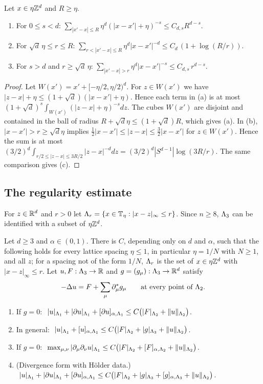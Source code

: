 \begin{lemma}\label{lem:lattice-sums}
Let $x\in\eta\mathbb Z^d$ and $R\ge\eta$.
\begin{enumerate}[label=(\alph*)]
\item For $0\le s<d$: $\sum_{|x'-x|\le R}\eta^d(|x-x'|+\eta)^{-s}\le C_{d,s}R^{d-s}$.
\item For $\sqrt d\,\eta\le r\le R$: $\sum_{r<|x'-x|\le R}\eta^d|x-x'|^{-d}\le C_d\,(1+\log(R/r))$.
\item For $s>d$ and $r\ge\sqrt d\,\eta$: $\sum_{|x'-x|>r}\eta^d|x-x'|^{-s}\le C_{d,s}\,r^{d-s}$.
\end{enumerate}
\end{lemma}

\begin{proof}
Let $W(x')=x'+[-\eta/2,\eta/2)^d$. For $z\in W(x')$ we have $|z-x|+\eta\le(1+\sqrt d)(|x-x'|+\eta)$. Hence each term in (a) is at most $(1+\sqrt d)^s\int_{W(x')}(|z-x|+\eta)^{-s}dz$. The cubes $W(x')$ are disjoint and contained in the ball of radius $R+\sqrt d\eta\le(1+\sqrt d)R$, which gives (a). In (b), $|x-x'|>r\ge\sqrt d\eta$ implies $\frac12|x-x'|\le|z-x|\le\frac32|x-x'|$ for $z\in W(x')$. Hence the sum is at most $(3/2)^d\int_{r/2\le|z-x|\le3R/2}|z-x|^{-d}dz=(3/2)^d|S^{d-1}|\log(3R/r)$. The same comparison gives (c).
\end{proof}

\subsection{The regularity estimate}

For $z\in\mathbb R^d$ and $r>0$ let $\Lambda_r=\{x\in\mathbb T_\eta:|x-z|_\infty\le r\}$. Since $n\ge8$, $\Lambda_3$ can be identified with a subset of $\eta\mathbb Z^d$.

\begin{theorem}\label{thm:local-regularity}
Let $d\ge3$ and $\alpha\in(0,1)$. There is $C$, depending only on $d$ and $\alpha$, such that the following holds for every lattice spacing $\eta\le1$, in particular $\eta=1/N$ with $N\ge1$, and all $z$; for a spacing not of the form $1/N$, $\Lambda_r$ is the set of $x\in\eta\mathbb Z^d$ with $|x-z|_\infty\le r$. Let $u,F:\Lambda_3\to\mathbb R$ and $g=(g_\mu):\Lambda_3\to\mathbb R^d$ satisfy
\[
-\Delta u=F+\sum_\mu\partial^*_\mu g_\mu\qquad\text{at every point of }\Lambda_2 .
\]
\begin{enumerate}[label=(\alph*)]
\item If $g=0$: $\ |u|_{\Lambda_1}+|\partial u|_{\Lambda_1}+[\partial u]_{\alpha,\Lambda_1}\le C\big(|F|_{\Lambda_2}+\|u\|_{\Lambda_2}\big)$.
\item In general: $\ |u|_{\Lam_1}+\Hol{u}{\Lam_1}\le C\big(|F|_{\Lam_2}+|g|_{\Lam_3}+\|u\|_{\Lam_2}\big)$.
\item If $g=0$: $\ \max_{\mu,\nu}|\partial_\mu\partial_\nu u|_{\Lambda_1}\le C\big(|F|_{\Lambda_2}+[F]_{\alpha,\Lambda_2}+\|u\|_{\Lambda_2}\big)$.
\item (Divergence form with H\"older data.) $\ |u|_{\Lam_1}+|\partial u|_{\Lam_1}+\Hol{\partial u}{\Lam_1}\le C\big(|F|_{\Lam_2}+|g|_{\Lam_3}+\Hol g{\Lam_3}+\|u\|_{\Lam_2}\big)$.
\end{enumerate}
\end{theorem}


